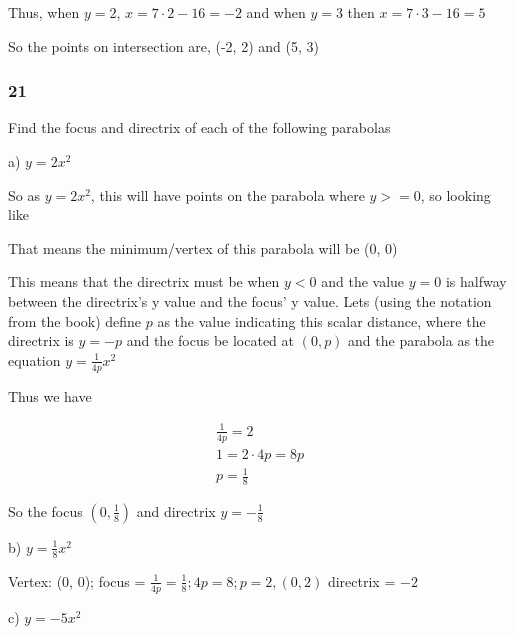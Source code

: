 \documentclass[]{report}
\begin{document}
Thus, when $y = 2$, $x = 7\cdot 2 - 16 = -2$ and when $y = 3$ then $x = 7\cdot 3 -16 = 5$

So the points on intersection are, (-2, 2) and (5, 3)


\subsubsection{21}
Find the focus and directrix of each of the following parabolas

a) $ y = 2x^2$

So as $ y = 2x^2$, this will have points on the parabola where $ y >= 0$, so looking like 


That means the minimum/vertex of this parabola will be (0, 0)

This means that the directrix must be when $ y < 0 $ and the value $y = 0$ is halfway between the directrix's y value and the focus' y value. Lets (using the notation from the book) define $p$ as the value indicating this scalar distance, where the directrix is $y = -p$ and the focus be located at $(0, p)$ and the parabola as the equation $y = \frac{1}{4p}x^2$

Thus we have

\begin{align*}
\frac{1}{4p} = 2\\
1 = 2 \cdot 4p = 8p\\
p = \frac{1}{8}
\end{align*}

So the focus $(0, \frac{1}{8})$ and directrix $y = - \frac{1}{8}$





b) $y = \frac{1}{8}x^2$


Vertex: (0, 0);
focus = $\frac{1}{4p} = \frac{1}{8}; 4p = 8; p=2, (0, 2)$
directrix = $-2$

c) $y = -5x^2$
\end{document}
